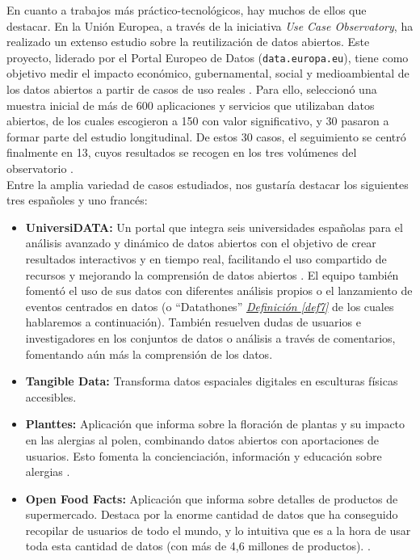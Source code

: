 En cuanto a trabajos más práctico-tecnológicos, hay muchos de ellos que destacar. En la Unión Europea, a través de la iniciativa \textit{Use Case Observatory}, ha realizado un extenso estudio sobre la reutilización de datos abiertos. Este proyecto, liderado por el Portal Europeo de Datos (\texttt{data.europa.eu}), tiene como objetivo medir el impacto económico, gubernamental, social y medioambiental de los datos abiertos a partir de casos de uso reales \citep{UseCaseObservatory2022V1}. Para ello, seleccionó una muestra inicial de más de 600 aplicaciones y servicios que utilizaban datos abiertos, de los cuales escogieron a 150 con valor significativo, y 30 pasaron a formar parte del estudio longitudinal. De estos 30 casos, el seguimiento se centró finalmente en 13, cuyos resultados se recogen en los tres volúmenes del observatorio \citep{UseCaseObservatory2024V2}. \\

Entre la amplia variedad de casos estudiados, nos gustaría destacar los siguientes tres españoles y uno francés:
\begin{itemize}
	\item \textbf{UniversiDATA:} Un portal que integra seis universidades españolas para el análisis avanzado y dinámico de datos abiertos con el objetivo de crear resultados interactivos y en tiempo real, facilitando el uso compartido de recursos y mejorando la comprensión de datos abiertos \citep{UniversiDATA}. El equipo también fomentó el uso de sus datos con diferentes análisis propios \citep{UniversiDATAAnalisis} o el lanzamiento de eventos centrados en datos (o ``Datathones'' \hyperref[def7]{\textit{Definición \ref*{def7}}} \citep{UniversiDATADatathon} de los cuales hablaremos a continuación). También resuelven dudas de usuarios e investigadores en los conjuntos de datos o análisis a través de comentarios, fomentando aún más la comprensión de los datos.
	
	\item \textbf{Tangible Data:} Transforma datos espaciales digitales en esculturas físicas accesibles.
	
	\item \textbf{Planttes:} Aplicación que informa sobre la floración de plantas y su impacto en las alergias al polen, combinando datos abiertos con aportaciones de usuarios. Esto fomenta la concienciación, información y educación sobre alergias \citep{PlanttesDataAPP}.
	
	\item \textbf{Open Food Facts:} Aplicación que informa sobre detalles de productos de supermercado. Destaca por la enorme cantidad de datos que ha conseguido recopilar de usuarios de todo el mundo, y lo intuitiva que es a la hora de usar toda esta cantidad de datos (con más de 4,6 millones de productos). \citep{OpenFoodFactsDataAPP}.
	
\end{itemize}

